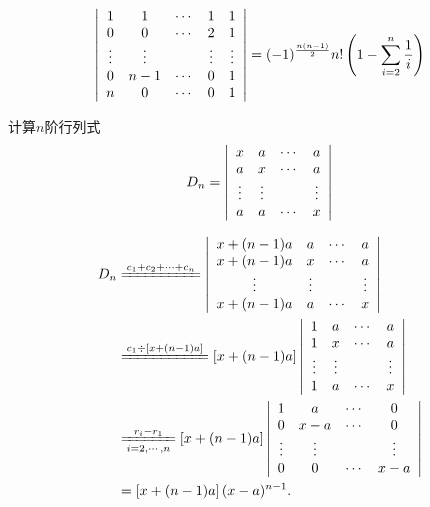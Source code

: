 \begin{frame}
\begin{testexample}
  $$
  \left|
    \begin{array}{ccccc}
      1 & 1 & \cdots & 1 & 1 \\
      0 & 0 & \cdots & 2 & 1 \\
      \vdots & \vdots & & \vdots & \vdots \\
      0 & n-1 & \cdots & 0 & 1 \\
      n & 0 & \cdots & 0 & 1
    \end{array}
  \right|  = (-1)^{\frac{n(n-1)}2} n! \left(1-\sum_{i=2}^n\frac1i\right)
  $$
\end{testexample}
\end{frame}

\begin{frame}
\begin{testexample}
  计算$n$阶行列式
  $$
  D_n = \left|
    \begin{array}{cccc}
      x & a & \cdots & a \\
      a & x & \cdots & a \\
      \vdots & \vdots & & \vdots \\
      a & a &  \cdots & x 
    \end{array}
  \right|
  $$
\end{testexample}
\end{frame}

\begin{frame}
 
  $$
  \begin{aligned}
    D_n  
    &  \xlongequal{c_1+c_2+\cd +c_n}
    \left|
      \begin{array}{cccc}
        x+(n-1)a & a     & \cd & a \\
        x+(n-1)a & x     & \cd & a \\
        \vd &      \vd &  & \vd \\
        x+(n-1)a & a     & \cd & x 
      \end{array}
    \right|  \\
    &  \xlongequal{c_1\div [x+(n-1)a] } 
    \left[x+(n-1)a\right]\left|
      \begin{array}{cccc}
        1 & a     & \cd & a \\
        1 & x     & \cd & a \\
        \vd   & \vd &  & \vd \\
        1 & a     & \cd & x 
      \end{array}
    \right|  \\
    &  \xlongequal[i = 2, \cd, n]{r_i - r_1} 
    \left[x+(n-1)a\right]\left|
      \begin{array}{cccc}
        1 & a   & \cd & 0 \\
        0 & x-a & \cd & 0 \\
        \vd  & \vd &  & \vd \\
        0 & 0   & \cd & x-a 
      \end{array}
    \right| \\
    & =  \left[x+(n-1)a\right](x-a)^{n-1}.
  \end{aligned}
  $$

\end{frame}

